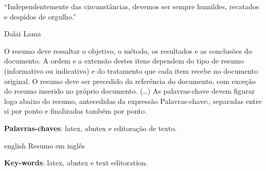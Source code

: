 \begin{epigrafe}	
``Independentemente das circunstâncias, devemos ser sempre humildes, recatados e despidos de orgulho.''
\\
\par
Dalai Lama 
\end{epigrafe}


\begin{resumo}
 O resumo deve ressaltar o
 objetivo, o método, os resultados e as conclusões do documento. A ordem e a extensão
 destes itens dependem do tipo de resumo (informativo ou indicativo) e do
 tratamento que cada item recebe no documento original. O resumo deve ser
 precedido da referência do documento, com exceção do resumo inserido no
 próprio documento. (\ldots) As palavras-chave devem figurar logo abaixo do
 resumo, antecedidas da expressão Palavras-chave:, separadas entre si por
 ponto e finalizadas também por ponto.

 \vspace{\onelineskip}
    
 \noindent
 \textbf{Palavras-chaves}: latex, abntex e editoração de texto.
\end{resumo}

\begin{resumo}[Abstract]
 \begin{otherlanguage*}{english}
	Resumo em inglês
   \vspace{\onelineskip}
 
   \noindent 
   \textbf{Key-words}: latex, abntex e text editoration.
 \end{otherlanguage*}
\end{resumo}

\listoffigures*
\cleardoublepage

\listoftables*
\cleardoublepage